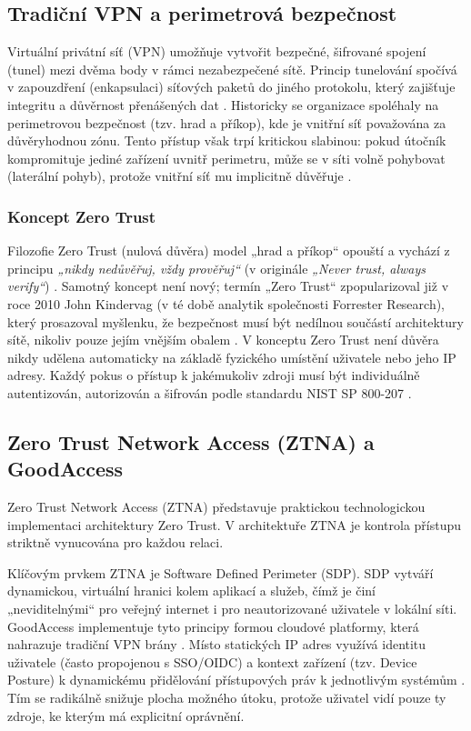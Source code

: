 \subsection{Tradiční VPN a perimetrová bezpečnost}
Virtuální privátní síť (VPN) umožňuje vytvořit bezpečné, šifrované spojení (tunel) mezi dvěma body v rámci nezabezpečené sítě. Princip tunelování spočívá v zapouzdření (enkapsulaci) síťových paketů do jiného protokolu, který zajišťuje integritu a důvěrnost přenášených dat \cite{ward_linux}. Historicky se organizace spoléhaly na perimetrovou bezpečnost (tzv. hrad a příkop), kde je vnitřní síť považována za důvěryhodnou zónu. Tento přístup však trpí kritickou slabinou: pokud útočník kompromituje jediné zařízení uvnitř perimetru, může se v síti volně pohybovat (laterální pohyb), protože vnitřní síť mu implicitně důvěřuje \cite{nist_800_207}.

\subsubsection{Koncept Zero Trust}
Filozofie Zero Trust (nulová důvěra) model „hrad a příkop“ opouští a vychází z principu \textit{„nikdy nedůvěřuj, vždy prověřuj“} (v originále \textit{„Never trust, always verify“}) \cite{kindervag2010nomore}. Samotný koncept není nový; termín „Zero Trust“ zpopularizoval již v roce 2010 John Kindervag (v té době analytik společnosti Forrester Research), který prosazoval myšlenku, že bezpečnost musí být nedílnou součástí architektury sítě, nikoliv pouze jejím vnějším obalem \cite{kindervag2010nomore}. V konceptu Zero Trust není důvěra nikdy udělena automaticky na základě fyzického umístění uživatele nebo jeho IP adresy. Každý pokus o přístup k jakémukoliv zdroji musí být individuálně autentizován, autorizován a šifrován podle standardu NIST SP 800-207 \cite{nist_800_207}.

\subsection{Zero Trust Network Access (ZTNA) a GoodAccess}

Zero Trust Network Access (ZTNA) představuje praktickou technologickou implementaci architektury Zero Trust. V architektuře ZTNA je kontrola přístupu striktně vynucována pro každou relaci.

Klíčovým prvkem ZTNA je Software Defined Perimeter (SDP). SDP vytváří dynamickou, virtuální hranici kolem aplikací a služeb, čímž je činí „neviditelnými“ pro veřejný internet i pro neautorizované uživatele v lokální síti. GoodAccess implementuje tyto principy formou cloudové platformy, která nahrazuje tradiční VPN brány \cite{goodaccess_architecture}. Místo statických IP adres využívá identitu uživatele (často propojenou s SSO/OIDC) a kontext zařízení (tzv. Device Posture) k dynamickému přidělování přístupových práv k jednotlivým systémům \cite{goodaccess_architecture}. Tím se radikálně snižuje plocha možného útoku, protože uživatel vidí pouze ty zdroje, ke kterým má explicitní oprávnění.

